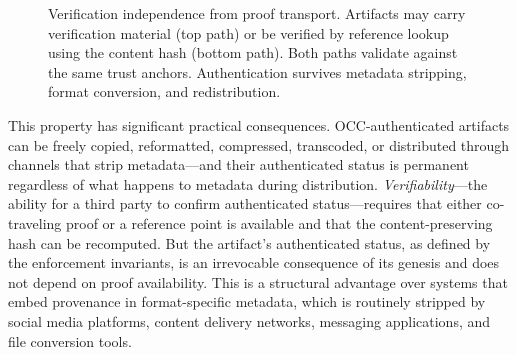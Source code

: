\documentclass[11pt,letterpaper]{article}
\theoremstyle{occplain}
\theoremstyle{occremark}
\begin{document}
\begin{figure}[htbp]
\centering
{}
\caption{Verification independence from proof transport. Artifacts may carry verification material (top path) or be verified by reference lookup using the content hash (bottom path). Both paths validate against the same trust anchors. Authentication survives metadata stripping, format conversion, and redistribution.}
\label{fig:verification-independence}
\end{figure}

This property has significant practical consequences. OCC-authenticated artifacts can be freely copied, reformatted, compressed, transcoded, or distributed through channels that strip metadata---and their authenticated status is permanent regardless of what happens to metadata during distribution. \emph{Verifiability}---the ability for a third party to confirm authenticated status---requires that either co-traveling proof or a reference point is available and that the content-preserving hash can be recomputed. But the artifact's authenticated status, as defined by the enforcement invariants, is an irrevocable consequence of its genesis and does not depend on proof availability. This is a structural advantage over systems that embed provenance in format-specific metadata, which is routinely stripped by social media platforms, content delivery networks, messaging applications, and file conversion tools.
\end{document}
